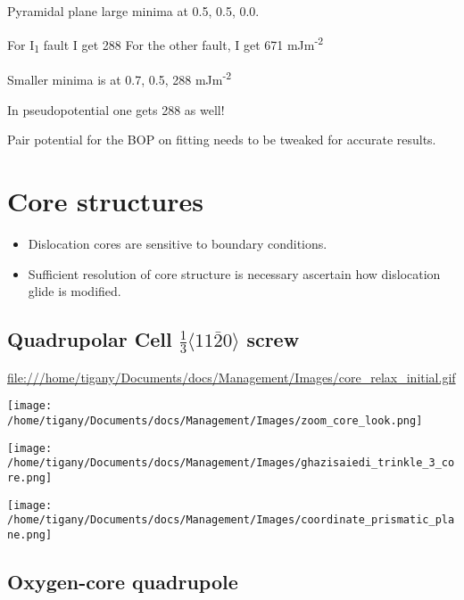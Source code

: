 \documentclass[11pt]{article}
\begin{document}
\begin{NOTES}
Pyramidal plane large minima at 0.5, 0.5, 0.0. 

For I\textsubscript{1} fault I get 288
For the other fault, I get 671 mJm\textsuperscript{-2}

Smaller minima is at 0.7, 0.5, 288 mJm\textsuperscript{-2}

In pseudopotential one gets 288 as well! 


Pair potential for the BOP on fitting needs to be tweaked for accurate
results.
\end{NOTES}


\section*{Core structures}
\label{sec:org41cfd14}
\begin{itemize}
\item Dislocation cores are sensitive to boundary conditions.
\item Sufficient resolution of core structure is necessary ascertain how
dislocation glide is modified.
\end{itemize}



\subsection*{Quadrupolar Cell \(\frac{1}{3}\langle11\bar{2}0\rangle\) screw}
\label{sec:org13d9eb3}


\url{file:///home/tigany/Documents/docs/Management/Images/core\_relax\_initial.gif}
\begin{center}
\texttt{[image: /home/tigany/Documents/docs/Management/Images/zoom\_core\_look.png]}
\end{center}

\begin{center}
\texttt{[image: /home/tigany/Documents/docs/Management/Images/ghazisaiedi\_trinkle\_3\_core.png]}
\end{center}

\begin{center}
\texttt{[image: /home/tigany/Documents/docs/Management/Images/coordinate\_prismatic\_plane.png]}
\end{center}


\subsection*{Oxygen-core quadrupole}
\label{sec:org8b5287b}
\end{document}
